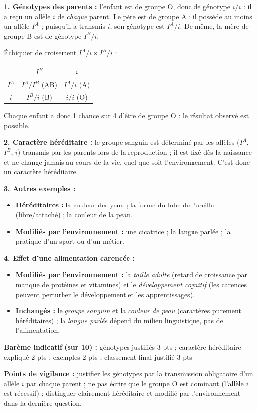 \documentclass[11pt]{article}
\begin{document}
\begin{corrige}
\textbf{1. Génotypes des parents :} l'enfant est de groupe O, donc de génotype $i/i$ : il a reçu un allèle $i$ de \emph{chaque} parent. Le père est de groupe A : il possède au moins un allèle $I^A$ ; puisqu'il a transmis $i$, son génotype est $I^A/i$. De même, la mère de groupe B est de génotype $I^B/i$.

Échiquier de croisement $I^A/i \times I^B/i$ :
\begin{center}
\begin{tabular}{|c|c|c|}\hline
 & $I^B$ & $i$ \\ \hline
$I^A$ & $I^A/I^B$ (AB) & $I^A/i$ (A) \\ \hline
$i$ & $I^B/i$ (B) & $i/i$ (O) \\ \hline
\end{tabular}
\end{center}
Chaque enfant a donc 1 chance sur 4 d'être de groupe O : le résultat observé est possible.

\textbf{2. Caractère héréditaire :} le groupe sanguin est déterminé par les allèles ($I^A$, $I^B$, $i$) transmis par les parents lors de la reproduction ; il est fixé dès la naissance et ne change jamais au cours de la vie, quel que soit l'environnement. C'est donc un caractère héréditaire.

\textbf{3. Autres exemples :}
\begin{itemize}
    \item \textbf{Héréditaires :} la couleur des yeux ; la forme du lobe de l'oreille (libre/attaché) ; la couleur de la peau.
    \item \textbf{Modifiés par l'environnement :} une cicatrice ; la langue parlée ; la pratique d'un sport ou d'un métier.
\end{itemize}

\textbf{4. Effet d'une alimentation carencée :}
\begin{itemize}
    \item \textbf{Modifiés par l'environnement :} la \emph{taille adulte} (retard de croissance par manque de protéines et vitamines) et le \emph{développement cognitif} (les carences peuvent perturber le développement et les apprentissages).
    \item \textbf{Inchangés :} le \emph{groupe sanguin} et la \emph{couleur de peau} (caractères purement héréditaires) ; la \emph{langue parlée} dépend du milieu linguistique, pas de l'alimentation.
\end{itemize}

\textbf{Barème indicatif (sur 10) :} génotypes justifiés 3 pts ; caractère héréditaire expliqué 2 pts ; exemples 2 pts ; classement final justifié 3 pts.

\textbf{Points de vigilance :} justifier les génotypes par la transmission obligatoire d'un allèle $i$ par chaque parent ; ne pas écrire que le groupe O est \og dominant \fg{} (l'allèle $i$ est récessif) ; distinguer clairement héréditaire et modifié par l'environnement dans la dernière question.
\end{corrige}
\end{document}
